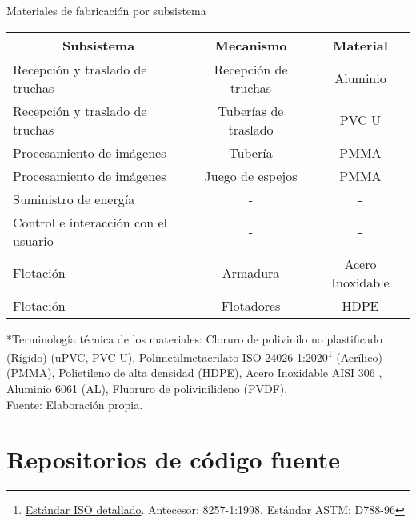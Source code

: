 \begin{savenotes}
	\begin{mytable}[H]
		\footnotesize\centering
		\caption{Materiales de fabricación por subsistema}
		\label{tab:materiales de fabricacion por subsistema}
		\begin{tabular}{|l|c|c|}
			\hline
			\multicolumn{1}{|c|}{\textbf{Subsistema}} & \multicolumn{1}{c|}{\textbf{Mecanismo}} & \textbf{Material} \\ \hline
			Recepción y traslado de truchas      & Recepción de truchas   & Aluminio  \\ \hline
			Recepción y traslado de truchas      & Tuberías de traslado   & PVC-U    \\ \hline
			Procesamiento de imágenes            & Tubería                & PMMA  \\ \hline
			Procesamiento de imágenes            & Juego de espejos       & PMMA  \\ \hline
			Suministro de energía                & \multicolumn{1}{c|}{-} & -    \\ \hline
			Control e interacción con el usuario & \multicolumn{1}{c|}{-} & -  \\ \hline
			Flotación                            & Armadura               & Acero Inoxidable \\ \hline
			Flotación                            & Flotadores             & HDPE  \\ \hline
		\end{tabular}
		\begin{myflushcenteraftertable}
		*Terminología técnica de los materiales: Cloruro de polivinilo no plastificado (Rígido) (uPVC, PVC-U), Polimetilmetacrilato ISO 24026-1:2020\footnote{\href{https://www.iso.org/standard/77547.html}{Estándar ISO detallado}. Antecesor: 8257-1:1998. Estándar ASTM: D788-96} (Acrílico) (PMMA), Polietileno de alta densidad (HDPE), Acero Inoxidable AISI 306 , Aluminio 6061 (AL), Fluoruro de polivinilideno (PVDF).\\	
		Fuente: Elaboración propia.
		\end{myflushcenteraftertable}
	\end{mytable}
\end{savenotes}

\section{Repositorios de código fuente}
\label{ssec:repositorio de codigo fuente}

